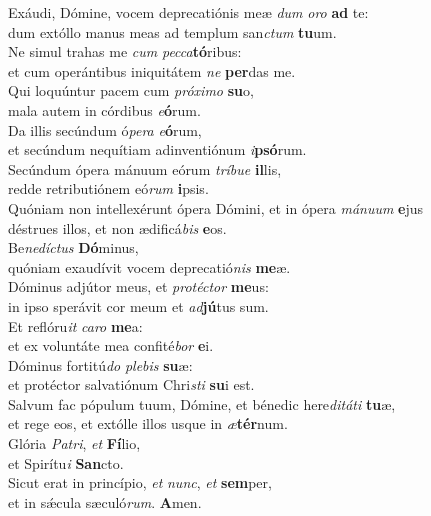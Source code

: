 \evenverse Exáudi, Dómine, vocem deprecatiónis meæ \textit{dum} \textit{o}\textit{ro} \textbf{ad} te:~\*\\
\evenverse dum extóllo manus meas ad templum san\textit{ctum} \textbf{tu}um.\\
\oddverse Ne simul trahas me \textit{cum} \textit{pec}\textit{ca}\textbf{tó}ribus:~\*\\
\oddverse et cum operántibus iniquitátem \textit{ne} \textbf{per}das me.\\
\evenverse Qui loquúntur pacem cum \textit{pró}\textit{xi}\textit{mo} \textbf{su}o,~\*\\
\evenverse mala autem in córdibus \textit{e}\textbf{ó}rum.\\
\oddverse Da illis secúndum ó\textit{pe}\textit{ra} \textit{e}\textbf{ó}rum,~\*\\
\oddverse et secúndum nequítiam adinventiónum \textit{i}\textbf{psó}rum.\\
\evenverse Secúndum ópera mánuum eórum \textit{trí}\textit{bu}\textit{e} \textbf{il}lis,~\*\\
\evenverse redde retributiónem eó\textit{rum} \textbf{i}psis.\\
\oddverse Quóniam non intellexérunt ópera Dómini, et in ópera \textit{má}\textit{nu}\textit{um} \textbf{e}jus~\*\\
\oddverse déstrues illos, et non ædificá\textit{bis} \textbf{e}os.\\
\evenverse Be\textit{ne}\textit{dí}\textit{ctus} \textbf{Dó}minus,~\*\\
\evenverse quóniam exaudívit vocem deprecatió\textit{nis} \textbf{me}æ.\\
\oddverse Dóminus adjútor meus, et \textit{pro}\textit{té}\textit{ctor} \textbf{me}us:~\*\\
\oddverse in ipso sperávit cor meum et \textit{ad}\textbf{jú}tus sum.\\
\evenverse Et reflóru\textit{it} \textit{ca}\textit{ro} \textbf{me}a:~\*\\
\evenverse et ex voluntáte mea confité\textit{bor} \textbf{e}i.\\
\oddverse Dóminus fortitú\textit{do} \textit{ple}\textit{bis} \textbf{su}æ:~\*\\
\oddverse et protéctor salvatiónum Chri\textit{sti} \textbf{su}i est.\\
\evenverse Salvum fac pópulum tuum, Dómine, et bénedic here\textit{di}\textit{tá}\textit{ti} \textbf{tu}æ,~\*\\
\evenverse et rege eos, et extólle illos usque in \textit{æ}\textbf{tér}num.\\
\oddverse Glória \textit{Pa}\textit{tri}, \textit{et} \textbf{Fí}lio,~\*\\
\oddverse et Spirítu\textit{i} \textbf{San}cto.\\
\evenverse Sicut erat in princípio, \textit{et} \textit{nunc}, \textit{et} \textbf{sem}per,~\*\\
\evenverse et in sǽcula sæculó\textit{rum}. \textbf{A}men.\\
